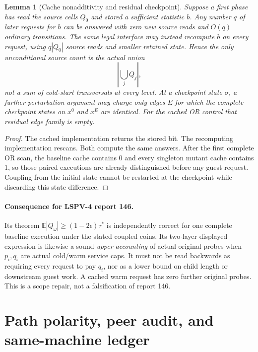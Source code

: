 \documentclass[11pt]{article}
\newtheorem{lemma}[theorem]{Lemma}
\begin{document}
\begin{lemma}[Cache nonadditivity and residual checkpoint]\label{lem:cache}
Suppose a first phase has read the source cells $Q_0$ and stored a sufficient statistic $b$.  Any number $q$ of later requests for $b$ can be answered with zero new source reads and $O(q)$ ordinary transitions.  The same legal interface may instead recompute $b$ on every request, using $q|Q_0|$ source reads and smaller retained state.  Hence the only unconditional source count is the actual union
\[
\left|\bigcup_j Q_j\right|,
\]
not a sum of cold-start transversals at every level.  At a checkpoint state $\sigma$, a further perturbation argument may charge only edges $E$ for which the complete checkpoint states on $x^0$ and $x^E$ are identical.  For the cached OR control that residual edge family is empty.
\end{lemma}
\begin{proof}
The cached implementation returns the stored bit.  The recomputing implementation rescans.  Both compute the same answers.  After the first complete OR scan, the baseline cache contains $0$ and every singleton mutant cache contains $1$, so those paired executions are already distinguished before any guest request.  Coupling from the initial state cannot be restarted at the checkpoint while discarding this state difference.
\end{proof}

\paragraph{Consequence for LSPV-4 report 146.}
Its theorem
\(\mathbb E|Q_\omega|\ge(1-2\epsilon)\tau^*\)
is independently correct for one complete baseline execution under the stated coupled coins.  Its two-layer displayed expression is likewise a sound \emph{upper accounting} of actual original probes when $p_i,q_i$ are actual cold/warm service caps.  It must not be read backwards as requiring every request to pay $q_i$, nor as a lower bound on child length or downstream guest work.  A cached warm request has zero further original probes.  This is a scope repair, not a falsification of report 146.

\section{Path polarity, peer audit, and same-machine ledger}
\end{document}
